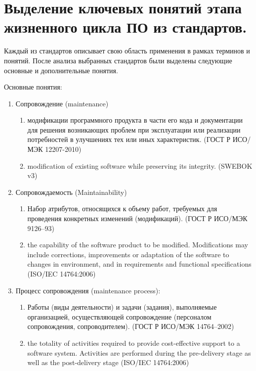
\pagebreak


\section{Выделение ключевых понятий этапа жизненного цикла ПО из стандартов.}

Каждый из стандартов описывает свою область применения в рамках терминов и понятий.
После анализа выбранных стандартов были выделены следующие основные и дополнительные понятия.


Основные понятия:
\begin{enumerate}
    \item Сопровождение (maintenance)
    \begin{enumerate}
        \item модификации программного продукта в части его кода и документации
        для решения возникающих проблем при эксплуатации или реализации потребностей в
        улучшениях тех или иных характеристик.
        (ГОСТ Р ИСО/МЭК 12207-2010)
        \item modification of existing software while preserving its integrity.
        (SWEBOK v3)
    \end{enumerate}

    \item Сопровождаемость (Maintainability)
    \begin{enumerate}
        \item Набор атрибутов, относящихся к объему работ, требуемых для проведения конкретных изменений (модификаций).
        (ГОСТ Р ИСО/МЭК 9126--93)
        \item the capability of the software product to be modified.
        Modifications may include corrections, improvements or adaptation of the software to changes in environment, and in requirements and functional specifications
        (ISO/IEC 14764:2006)
    \end{enumerate}

    \item Процесс сопровождения (maintenance process):
    \begin{enumerate}
        \item Работы (виды деятельности) и задачи (задания), выполняемые организацией, осуществляющей сопровождение (персоналом сопровождения, сопроводителем).
        (ГОСТ Р ИСО/МЭК 14764--2002)
        \item the totality of activities required to provide cost-effective support to a software system.
        Activities are performed during the pre-delivery stage as well as the post-delivery stage
        (ISO/IEC 14764:2006)
    \end{enumerate}
\end{enumerate}


